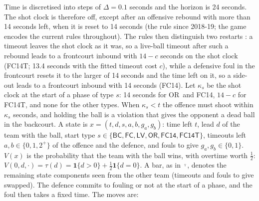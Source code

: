 \documentclass[article]{jdssv}
\newcommand{\BC}{\textsf{BC}}
\newcommand{\FC}{\textsf{FC}}
\newcommand{\LV}{\textsf{LV}}
\newcommand{\OR}{\textsf{OR}}
\begin{document}
Time is discretised into steps of $\Delta=0.1$ seconds and the horizon is 24 seconds. The shot clock is
therefore off, except after an offensive rebound with more than 14 seconds left, when it is reset to
14 seconds (the rule since 2018-19; the game encodes the current rules throughout). The rules then
distinguish two restarts \citep{nbarules}: a timeout leaves the shot clock as it was, so a live-ball timeout
after such a rebound leads to a frontcourt inbound with $14-c$ seconds on the shot clock (\textsf{FC14T};
13.4 seconds with the fitted timeout cost $c$), while a defensive foul in the frontcourt resets it to the larger of
14 seconds and the time left on it, so a side-out leads to a frontcourt inbound with 14 seconds (\textsf{FC14}). Let
$\kappa_s$ be the shot clock at the start of a phase of type $s$: 14 seconds for \OR\ and \textsf{FC14}, $14-c$ for
\textsf{FC14T}, and none for the other types. When $\kappa_s<t$ the offence must shoot within $\kappa_s$ seconds, and
holding the ball is a violation that gives the opponent a dead ball in the backcourt. A state is
$x=(t,d,s,a,b,g_a,g_b)$: time left $t$, lead $d$ of the team with the
ball, start type $s\in\{\BC,\FC,\LV,\OR,\textsf{FC14},\textsf{FC14T}\}$, timeouts left $a,b\in\{0,1,2^+\}$ of the offence and the defence,
and fouls to give $g_a,g_b\in\{0,1\}$. $V(x)$ is the probability that the team with the ball wins, with overtime
worth $\frac12$: $V(0,d,\cdot)=\tau(d)=\mathbf{1}\{d>0\}+\frac12\mathbf{1}\{d=0\}$. A bar, as in $\bar\cdot$,
denotes the remaining state components seen from the other team (timeouts and fouls to give swapped).
The defence commits to fouling or not at the start of a phase, and the foul then takes a fixed time. The moves are:
\end{document}
